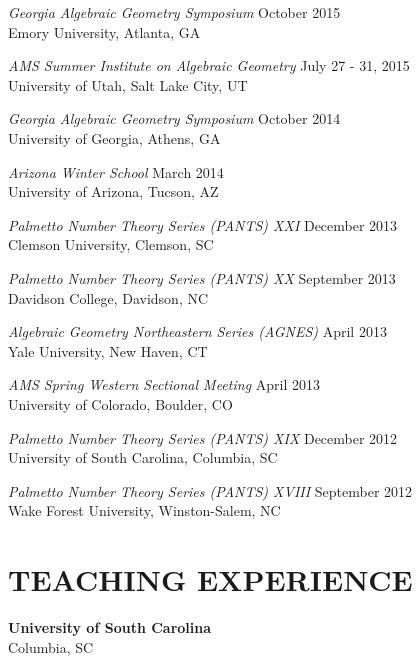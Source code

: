 \documentclass[line,overlapped]{res}
\begin{document}
\begin{resume}
         \textsl{Georgia Algebraic Geometry Symposium} \hfill October 2015\\
         Emory University, Atlanta, GA

         \textsl{AMS Summer Institute on Algebraic Geometry} \hfill July 27 - 31, 2015\\
         University of Utah, Salt Lake City, UT

         \textsl{Georgia Algebraic Geometry Symposium} \hfill October 2014\\
         University of Georgia, Athens, GA

         \textsl{Arizona Winter School} \hfill March 2014\\
         University of Arizona, Tucson, AZ

         \textsl{Palmetto Number Theory Series (PANTS) XXI} \hfill December 2013\\
         Clemson University, Clemson, SC

         \textsl{Palmetto Number Theory Series (PANTS) XX} \hfill September 2013\\
         Davidson College, Davidson, NC

         \textsl{Algebraic Geometry Northeastern Series (AGNES)} \hfill April 2013\\
         Yale University, New Haven, CT

         \textsl{AMS Spring Western Sectional Meeting} \hfill April 2013\\
         University of Colorado, Boulder, CO

         \textsl{Palmetto Number Theory Series (PANTS) XIX} \hfill December 2012\\
         University of South Carolina, Columbia, SC

         \textsl{Palmetto Number Theory Series (PANTS) XVIII} \hfill September 2012\\
         Wake Forest University, Winston-Salem, NC

\newpage

 \section{TEACHING EXPERIENCE}
         {\bf University of South Carolina}\\Columbia, SC
         

\end{resume}
\end{document}
